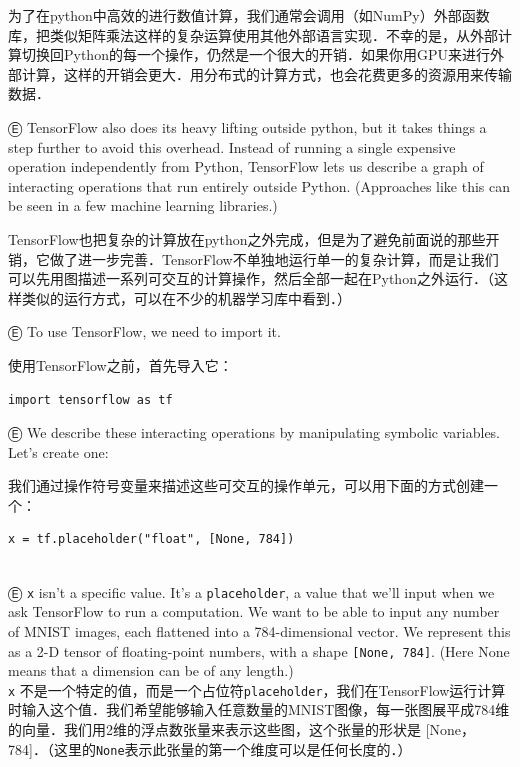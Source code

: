 为了在python中高效的进行数值计算，我们通常会调用（如NumPy）外部函数库，把类似矩阵乘法这样的复杂运算使用其他外部语言实现．不幸的是，从外部计算切换回Python的每一个操作，仍然是一个很大的开销．如果你用GPU来进行外部计算，这样的开销会更大．用分布式的计算方式，也会花费更多的资源用来传输数据．

Ⓔ TensorFlow also does its heavy lifting outside python, but it takes things a step further to avoid this overhead. Instead of running a single expensive operation independently from Python, TensorFlow lets us describe a graph of interacting operations that run entirely outside Python. (Approaches like this can be seen in a few machine learning libraries.)

TensorFlow也把复杂的计算放在python之外完成，但是为了避免前面说的那些开销，它做了进一步完善．TensorFlow不单独地运行单一的复杂计算，而是让我们可以先用图描述一系列可交互的计算操作，然后全部一起在Python之外运行．（这样类似的运行方式，可以在不少的机器学习库中看到．）


Ⓔ To use TensorFlow, we need to import it.

使用TensorFlow之前，首先导入它：

\begin{lstlisting}
import tensorflow as tf
\end{lstlisting}

Ⓔ We describe these interacting operations by manipulating symbolic variables. Let's create one:

我们通过操作符号变量来描述这些可交互的操作单元，可以用下面的方式创建一个：

\begin{lstlisting}
x = tf.placeholder("float", [None, 784])
\end{lstlisting}\\
Ⓔ \lstinline{x} isn't a specific value. It's a \lstinline{placeholder}, a value that we'll input when we ask TensorFlow to run a computation. We want to be able to input any number of MNIST images, each flattened into a 784-dimensional vector. We represent this as a 2-D tensor of floating-point numbers, with a shape \lstinline{[None, 784]}. (Here None means that a dimension can be of any length.)\\
\lstinline{x} 不是一个特定的值，而是一个占位符\lstinline{placeholder}，我们在TensorFlow运行计算时输入这个值．我们希望能够输入任意数量的MNIST图像，每一张图展平成784维的向量．我们用2维的浮点数张量来表示这些图，这个张量的形状是 [None，784]．（这里的\lstinline{None}表示此张量的第一个维度可以是任何长度的．）


